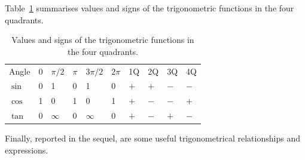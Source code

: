 Table~\ref{Tab:trig} summarises values and signs of the trigonometric functions in the four quadrants.
\begin{table}[h!]
\label{Tab:trig}
  \centering
  \begin{tabular}{ l  l  l  l  l  l  l  l  l  l }
  \hline
  Angle  & 0 & $\pi/2$  & $\pi$ & $3\pi/2$ & $2\pi$ & 1Q  & 2Q  & 3Q  & 4Q \\
  $\sin$ & 0 & 1        & 0     & 1        & 0      & $+$ & $+$ & $-$ & $-$\\
  $\cos$ & 1 & 0        & 1     & 0        & 1      & $+$ & $-$ & $-$ & $+$\\
  $\tan$ & 0 & $\infty$ & 0     & $\infty$ & 0      & $+$ & $-$ & $+$ & $-$\\
  \hline
  \end{tabular}
\caption{Values and signs of the trigonometric functions in the four quadrants.}
\end{table}

Finally, reported in the sequel, are some useful trigonometrical relationships and expressions.

